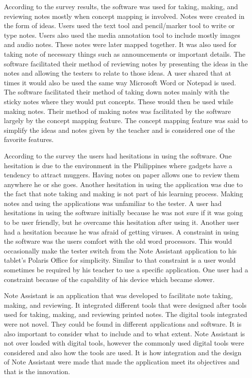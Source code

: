 According to the survey results, the software was used for taking, making, and reviewing notes mostly when concept mapping is involved. Notes were created in the form of ideas. Users used the text tool and pencil/marker tool to write or type notes. Users also used the media annotation tool to include mostly images and audio notes. These notes were later mapped together. It was also used for taking note of necessary things such as announcements or important details. The software facilitated their method of reviewing notes by presenting the ideas in the notes and allowing the testers to relate to those ideas. A user shared that at times it would also be used the same way Microsoft Word or Notepad is used. The software facilitated their method of taking down notes mainly with the sticky notes where they would put concepts. These would then be used while making notes. Their method of making notes was facilitated by the software largely by the concept mapping feature. The concept mapping feature was said to simplify the ideas and notes given by the teacher and is considered one of the favorite features.

According to the survey the users had hesitations in using the software. One hesitation is due to the environment in the Philippines where gadgets have a tendency to attract muggers. Having notes on paper allows one to review them anywhere he or she goes. Another hesitation in using the application was due to the fact that note taking and making is not part of his learning process. Making notes and using the applications was unfamiliar to the tester. A user had hesitations in using the software initially because he was not sure if it was going to be user friendly, but he overcame this hesitation after using it. Another user had a hesitation because he was afraid of getting viruses. A constraint in using the software was the users comfort with the old word processors. This would occasionally make the tester switch from the Note Assistant application to his tablet's Polaris Office for simplicity. Similar to that constraint is a user would sometimes be required by his teacher to use a specific application. One user had a constraint because of the capability of his device which became slower. 

Note Assistant is an application that was developed to facilitate note taking, making, and reviewing. It integrated different tools that were designed after tools used for taking, making, and reviewing printed notes. The digital tools integrated were not novel. They could be found in different applications and software. It is also important to consider what to include and to what extent. Note Assistant is not over loaded with digital tools, however the commonly used digital tools were considered and also how the tools are used. It is how integration and the design of Note Assistant were made that made the application meet its objectives and that is the innovation. 

